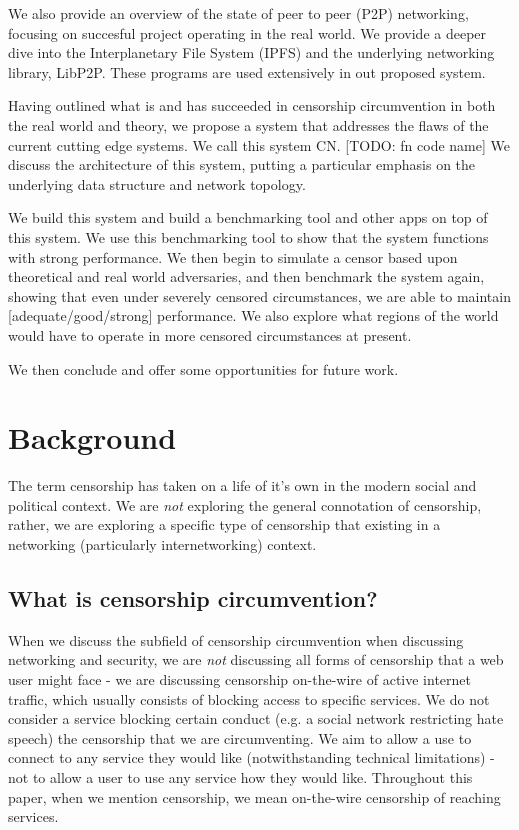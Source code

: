 \documentclass[12pt]{report}
\begin{document}
We also provide an overview of the state of peer to peer (P2P) networking, focusing on succesful project operating in the real world. We provide a deeper dive into the Interplanetary File System (IPFS) and the underlying networking library, LibP2P. These programs are used extensively in out proposed system.

Having outlined what is and has succeeded in censorship circumvention in both the real world and theory, we propose a system that addresses the flaws of the current cutting edge systems. We call this system CN. [TODO: fn code name] We discuss the architecture of this system, putting a particular emphasis on the underlying data structure and network topology.

We build this system and build a benchmarking tool and other apps on top of this system. We use this benchmarking tool to show that the system functions with strong performance. We then begin to simulate a censor based upon theoretical and real world adversaries, and then benchmark the system again, showing that even under severely censored circumstances, we are able to maintain [adequate/good/strong] performance. We also explore what regions of the world would have to operate in more censored circumstances at present.

We then conclude and offer some opportunities for future work.

\chapter{Background}

The term censorship has taken on a life of it's own in the modern social and political context. We are \emph{not} exploring the general connotation of censorship, rather, we are exploring a specific type of censorship that existing in a networking (particularly internetworking) context.

\section{What is censorship circumvention?}

When we discuss the subfield of censorship circumvention when discussing networking and security, we are \emph{not} discussing all forms of censorship that a web user might face - we are discussing censorship on-the-wire of active internet traffic, which usually consists of blocking access to specific services. We do not consider a service blocking certain conduct (e.g. a social network restricting hate speech) the censorship that we are circumventing. We aim to allow a use to connect to any service they would like (notwithstanding technical limitations) - not to allow a user to use any service how they would like. Throughout this paper, when we mention censorship, we mean on-the-wire censorship of reaching services.
\end{document}
